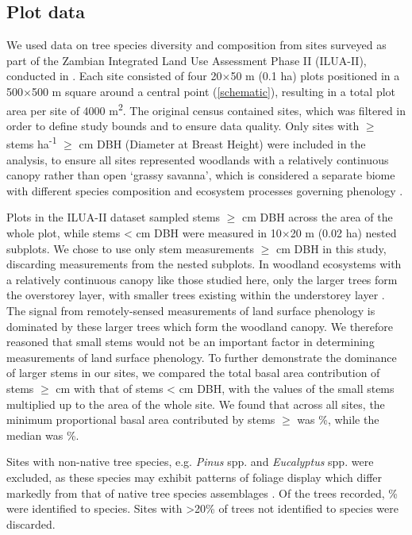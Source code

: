 \documentclass[11pt,a4paper]{article}
\begin{document}
\subsection{Plot data}

We used data on tree species diversity and composition from \nSites{} sites
surveyed as part of the Zambian Integrated Land Use Assessment Phase II
(ILUA-II), conducted in \censusDate{} \citep{Mukosha2009, Pelletier2018}. Each
site consisted of four 20$\times$50 m (0.1 ha) plots positioned in a
500$\times$500 m square around a central point (\autoref{schematic}), resulting
in a total plot area per site of 4000 m\textsuperscript{2}. The original census
contained \nTotalSites{} sites, which was filtered in order to define study
bounds and to ensure data quality. Only sites with $\geq$\treesHa{} stems
ha\textsuperscript{-1} $\geq$\stemSize{} cm DBH (Diameter at Breast Height)
were included in the analysis, to ensure all sites represented woodlands with a
relatively continuous canopy rather than open `grassy savanna', which is
considered a separate biome with different species composition and ecosystem
processes governing phenology \citep{Morellato2013, Keith2020}. 

Plots in the ILUA-II dataset sampled stems $\geq$\stemSize{} cm DBH across the
area of the whole plot, while stems <\stemSize{} cm DBH were measured in
10$\times$20 m (0.02 ha) nested subplots. We chose to use only stem
measurements $\geq$\stemSize{} cm DBH in this study, discarding measurements
from the nested subplots. In woodland ecosystems with a relatively continuous
canopy like those studied here, only the larger trees form the overstorey layer,
with smaller trees existing within the understorey layer \citep{Chidumayo2001}.
The signal from remotely-sensed measurements of land surface phenology is
dominated by these larger trees which form the woodland canopy. We therefore
reasoned that small stems would not be an important factor in determining
measurements of land surface phenology. To further demonstrate the dominance of
larger stems in our sites, we compared the total basal area contribution of
stems $\geq$\stemSize{} cm with that of stems <\stemSize{} cm DBH, with the
values of the small stems multiplied up to the area of the whole site. We found
that across all sites, the minimum proportional basal area contributed by stems
$\geq$\stemSize{} was \minPropBABig{}\%, while the median was
\medianPropBABig{}\%.

Sites with non-native tree species, e.g. \textit{Pinus} spp. and
\textit{Eucalyptus} spp. were excluded, as these species may exhibit patterns
of foliage display which differ markedly from that of native tree species
assemblages \citep{Broadhead2003}. Of the \nTrees{} trees recorded,
\perSpID{}\% were identified to species. Sites with >20\% of trees not
identified to species were discarded.
\end{document}
